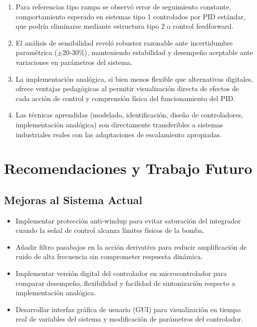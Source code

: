 \documentclass[conference]{IEEEtran}
\begin{document}
\begin{enumerate}
\item Para referencias tipo rampa se observó error de seguimiento constante, comportamiento esperado en sistemas tipo 1 controlados por PID estándar, que podría eliminarse mediante estructura tipo 2 o control feedforward.

\item El análisis de sensibilidad reveló robustez razonable ante incertidumbre paramétrica ($\pm$20-30\%), manteniendo estabilidad y desempeño aceptable ante variaciones en parámetros del sistema.

\item La implementación analógica, si bien menos flexible que alternativas digitales, ofrece ventajas pedagógicas al permitir visualización directa de efectos de cada acción de control y comprensión física del funcionamiento del PID.

\item Las técnicas aprendidas (modelado, identificación, diseño de controladores, implementación analógica) son directamente transferibles a sistemas industriales reales con las adaptaciones de escalamiento apropiadas.
\end{enumerate}

\section{Recomendaciones y Trabajo Futuro}

\subsection{Mejoras al Sistema Actual}

\begin{itemize}
\item Implementar protección anti-windup para evitar saturación del integrador cuando la señal de control alcanza límites físicos de la bomba.

\item Añadir filtro pasabajos en la acción derivativa para reducir amplificación de ruido de alta frecuencia sin comprometer respuesta dinámica.

\item Implementar versión digital del controlador en microcontrolador para comparar desempeño, flexibilidad y facilidad de sintonización respecto a implementación analógica.

\item Desarrollar interfaz gráfica de usuario (GUI) para visualización en tiempo real de variables del sistema y modificación de parámetros del controlador.
\end{itemize}
\end{document}
